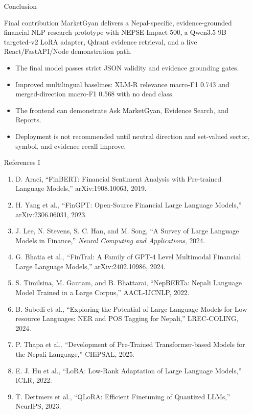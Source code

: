 \documentclass[aspectratio=169,11pt]{beamer}
\begin{document}
\begin{frame}{Conclusion}
  \begin{block}{Final contribution}
    MarketGyan delivers a Nepal-specific, evidence-grounded financial NLP research prototype with NEPSE-Impact-500, a Qwen3.5-9B targeted-v2 LoRA adapter, Qdrant evidence retrieval, and a live React/FastAPI/Node demonstration path.
  \end{block}

  \begin{itemize}
    \item The final model passes strict JSON validity and evidence grounding gates.
    \item Improved multilingual baselines: XLM-R relevance macro-F1 0.743 and merged-direction macro-F1 0.568 with no dead class.
    \item The frontend can demonstrate Ask MarketGyan, Evidence Search, and Reports.
    \item Deployment is not recommended until neutral direction and set-valued sector, symbol, and evidence recall improve.
  \end{itemize}

\end{frame}

\begin{frame}{References I}
  \tiny
  \begin{enumerate}
    \item D. Araci, ``FinBERT: Financial Sentiment Analysis with Pre-trained Language Models,'' arXiv:1908.10063, 2019.
    \item H. Yang et al., ``FinGPT: Open-Source Financial Large Language Models,'' arXiv:2306.06031, 2023.
    \item J. Lee, N. Stevens, S. C. Han, and M. Song, ``A Survey of Large Language Models in Finance,'' \emph{Neural Computing and Applications}, 2024.
    \item G. Bhatia et al., ``FinTral: A Family of GPT-4 Level Multimodal Financial Large Language Models,'' arXiv:2402.10986, 2024.
    \item S. Timilsina, M. Gautam, and B. Bhattarai, ``NepBERTa: Nepali Language Model Trained in a Large Corpus,'' AACL-IJCNLP, 2022.
    \item B. Subedi et al., ``Exploring the Potential of Large Language Models for Low-resource Languages: NER and POS Tagging for Nepali,'' LREC-COLING, 2024.
    \item P. Thapa et al., ``Development of Pre-Trained Transformer-based Models for the Nepali Language,'' CHiPSAL, 2025.
    \item E. J. Hu et al., ``LoRA: Low-Rank Adaptation of Large Language Models,'' ICLR, 2022.
    \item T. Dettmers et al., ``QLoRA: Efficient Finetuning of Quantized LLMs,'' NeurIPS, 2023.
  \end{enumerate}
\end{frame}
\end{document}
